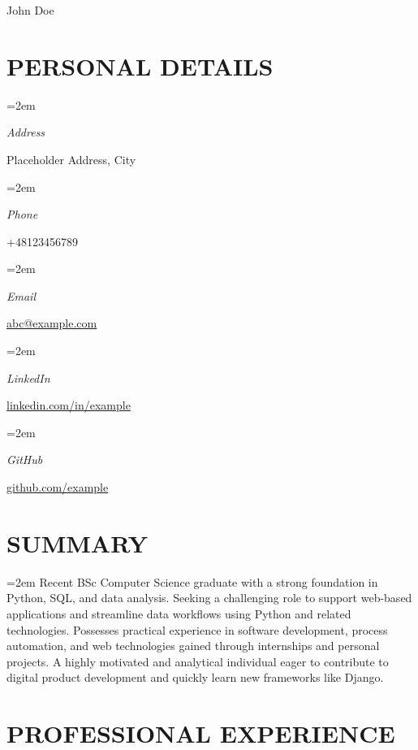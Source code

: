 \documentclass[paper=a4,fontsize=11pt]{scrartcl} %
\newlength{\spacebox}
\newcommand{\sepspace}{\vspace*{1em}} %
\newcommand{\MyName}[1]{
\Huge \usefont{OT1}{phv}{b}{n} \hfill #1 %
\par \normalsize \normalfont}
\newcommand{\NewPart}[1]{\section*{\uppercase{#1}}} %
\newcommand{\PersonalEntry}[2]{
\noindent\hangindent=2em\hangafter=0 %
\parbox{\spacebox}{        %
\textit{#1}}		       %
\hspace{1.5em} #2 \par}    %
\begin{document}

\MyName{John Doe}

\sepspace %

\NewPart{Personal Details}{}
\PersonalEntry{Address}{Placeholder Address, City}
\PersonalEntry{Phone}{+48123456789}
\PersonalEntry{Email}{\url{abc@example.com}} %
\PersonalEntry{LinkedIn}{\url{linkedin.com/in/example}} %
\PersonalEntry{GitHub}{\url{github.com/example}} %

\NewPart{Summary}{}
\noindent\hangindent=2em %
Recent BSc Computer Science graduate with a strong foundation in Python, SQL, and data analysis. Seeking a challenging role to support web-based applications and streamline data workflows using Python and related technologies. Possesses practical experience in software development, process automation, and web technologies gained through internships and personal projects. A highly motivated and analytical individual eager to contribute to digital product development and quickly learn new frameworks like Django.
\normalsize \par %
\sepspace



\NewPart{Professional Experience}{}
\end{document}
